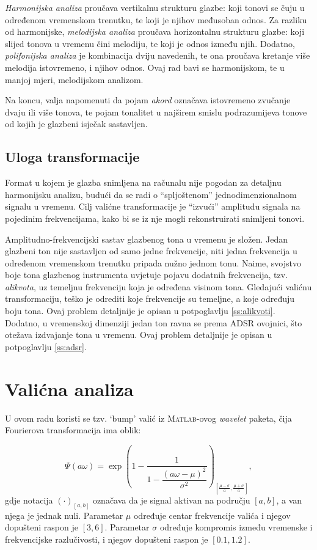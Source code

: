 \documentclass[a4paper, 11pt, twocolumn]{article}
\begin{document}
\textit{Harmonijska analiza} proučava vertikalnu strukturu glazbe: koji tonovi se čuju u određenom vremenskom trenutku, te koji je njihov međusoban odnos.
Za razliku od harmonijske, \textit{melodijska analiza} proučava horizontalnu strukturu glazbe: koji slijed tonova u vremenu čini melodiju, te koji je odnos između njih.
Dodatno, \textit{polifonijska analiza} je kombinacija dviju navedenih, te ona proučava kretanje više melodija istovremeno, i njihov odnos.
Ovaj rad bavi se harmonijskom, te u manjoj mjeri, melodijskom analizom.

Na koncu, valja napomenuti da pojam \textit{akord} označava istovremeno zvučanje dvaju ili više tonova, te pojam tonalitet u najširem smislu podrazumijeva tonove od kojih je glazbeni isječak sastavljen.

\subsection{Uloga transformacije}
Format u kojem je glazba snimljena na računalu nije pogodan za detaljnu harmonijsku analizu, budući da se radi o ``spljoštenom'' jednodimenzionalnom signalu u vremenu.
Cilj valićne transformacije je ``izvući'' amplitudu signala na pojedinim frekvencijama, kako bi se iz nje mogli rekonstruirati snimljeni tonovi.

Amplitudno-frekvencijski sastav glazbenog tona u vremenu je složen.
Jedan glazbeni ton nije sastavljen od samo jedne frekvencije, niti jedna frekvencija u određenom vremenskom trenutku pripada nužno jednom tonu.
Naime, svojstvo boje tona glazbenog instrumenta uvjetuje pojavu dodatnih frekvencija, tzv. \textit{alikvota}, uz temeljnu frekvenciju koja je određena visinom tona.
Gledajući valićnu transformaciju, teško je odrediti koje frekvencije su temeljne, a koje određuju boju tona.
Ovaj problem detaljnije je opisan u potpoglavlju \ref{ss:alikvoti}.
Dodatno, u vremenskoj dimenziji jedan ton ravna se prema ADSR ovojnici, što otežava izdvajanje tona u vremenu.
Ovaj problem detaljnije je opisan u potpoglavlju \ref{ss:adsr}.

\section{Valićna analiza}
U ovom radu koristi se tzv. `bump' valić iz \textsc{Matlab}-ovog \textit{wavelet} paketa, čija Fourierova transformacija ima oblik:

$$ \Psi\left( a \omega \right) = \exp\left( 1 - \dfrac{1}{1 - \dfrac{\left(a \omega - \mu \right)^2}{\sigma^2}} \right)_{\left[ \frac{\mu - \sigma}{a}, \frac{\mu + \sigma}{a} \right]}, $$
gdje notacija $(\cdot)_{[a, b]}$ označava da je signal aktivan na području $[a, b]$, a van njega je jednak nuli.
Parametar $\mu$ određuje centar frekvencije valića i njegov dopušteni raspon je $[3, 6]$.
Parametar $\sigma$ određuje kompromis između vremenske i frekvencijske razlučivosti, i njegov dopušteni raspon je $[0.1, 1.2]$.
\end{document}
